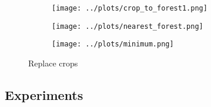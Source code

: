 \documentclass[]{article}
\begin{document}
\begin{figure}[H]
    \begin{subfigure}[b]{\linewidth}
        \centering
        \texttt{[image: ../plots/crop\_to\_forest1.png]}
    \end{subfigure}
    \begin{subfigure}[b]{\linewidth}
        \centering
        \texttt{[image: ../plots/nearest\_forest.png]}
    \end{subfigure}
    \begin{subfigure}[b]{\linewidth}
        \centering
        \texttt{[image: ../plots/minimum.png]}
    \end{subfigure}
    \caption{Replace crops}
    \label{fig:to_forest}
\end{figure}


\subsection{Experiments}
\end{document}

